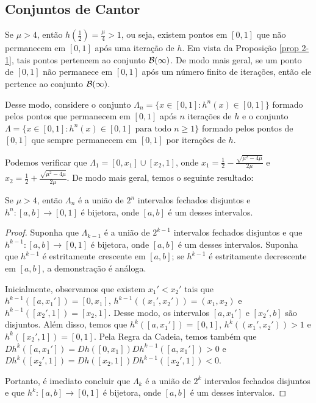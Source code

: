 \subsection{Conjuntos de Cantor}

Se $\mu > 4$, então $h(\frac{1}{2}) = \frac{\mu}{4} > 1$, ou seja, existem pontos em $[0, 1]$ que não permanecem em $[0, 1]$ após uma iteração de $h$. Em vista da Proposição \ref{prop 2-1}, tais pontos pertencem ao conjunto $\mathcal{B}(\infty)$. De modo mais geral, se um ponto de $[0, 1]$ não permanece em $[0, 1]$ após um número finito de iterações, então ele pertence ao conjunto $\mathcal{B}(\infty)$.

Desse modo, considere o conjunto $\Lambda_n = \lbrace x \in [0, 1] : h^n(x) \in [0, 1] \rbrace$ formado pelos pontos que permanecem em $[0, 1]$ após $n$ iterações de $h$ e o conjunto $\Lambda =  \lbrace x \in [0, 1] : h^n(x) \in [0, 1] \text{ para todo } n \geq 1 \rbrace$ formado pelos pontos de $[0, 1]$ que sempre permanecem em $[0, 1]$ por iterações de $h$.

Podemos verificar que $\Lambda_1 = [0, x_1] \cup [x_2, 1]$, onde $x_1 = \frac{1}{2} - \frac{\sqrt{\mu^2 - 4\mu}}{2\mu}$ e $x_2 = \frac{1}{2} + \frac{\sqrt{\mu^2 - 4\mu}}{2\mu}$. De modo mais geral, temos o seguinte resultado:

\begin{proposition}
Se $\mu > 4$, então $\Lambda_n$ é a união de $2^n$ intervalos fechados disjuntos e $h^n: [a, b] \to [0, 1]$ é bijetora, onde $[a, b]$ é um desses intervalos.
\end{proposition}

\begin{proof}
Suponha que $\Lambda_{k-1}$ é a união de $2^{k-1}$ intervalos fechados disjuntos e que $h^{k-1}: [a, b] \to [0, 1]$ é bijetora, onde $[a, b]$ é um desses intervalos.
Suponha que $h^{k-1}$ é estritamente crescente em $[a, b]$; se $h^{k-1}$ é estritamente decrescente em $[a, b]$, a demonstração é análoga.

Inicialmente, observamos que existem $x_1' < x_2'$ tais que $h^{k-1}([a, x_1']) = [0, x_1]$, $h^{k-1}((x_1', x_2')) = (x_1, x_2)$ e $h^{k-1}([x_2', 1]) = [x_2, 1]$.
Desse modo, os intervalos $[a, x_1']$ e $[x_2', b]$ são disjuntos.
Além disso, temos que $h^k([a, x_1']) = [0, 1]$, $h^k((x_1', x_2')) > 1$  e $h^k([x_2', 1]) = [0, 1]$.
Pela Regra da Cadeia, temos também que $D h^k([a, x_1']) = D h([0, x_1]) D h^{k-1}([a, x_1']) > 0$ e $D h^k([x_2', 1]) = D  h([x_2, 1]) D h^{k-1}([x_2', 1]) < 0$.

Portanto, é imediato concluir que $\Lambda_k$ é a união de $2^k$ intervalos fechados disjuntos e que $h^k: [a, b] \to [0, 1]$ é bijetora, onde $[a, b]$ é um desses intervalos.
\end{proof}


